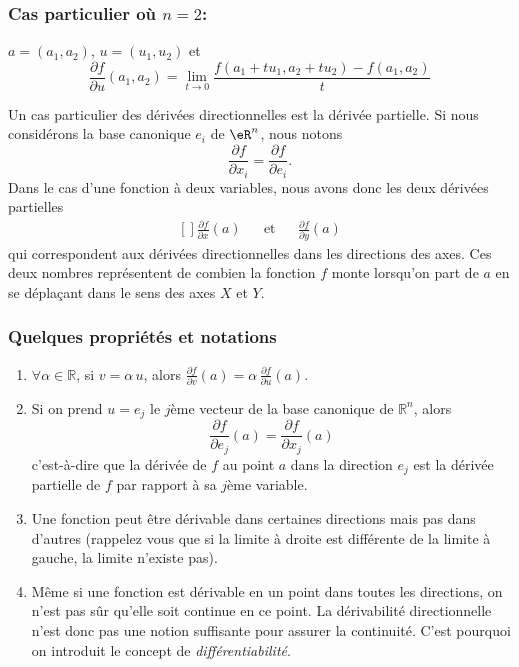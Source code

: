 \subsubsection*{Cas particulier où $n=2$:} $a = (a_1, a_2)$, $u =
(u_1,u_2)$ et
$$\frac{\partial f}{\partial u}(a_1, a_2) = \lim_{t\rightarrow
0}\frac{f(a_1+tu_1,a_2+tu_2) - f(a_1, a_2)}{t}$$

Un cas particulier des dérivées directionnelles est la dérivée partielle. Si nous considérons la base canonique $e_i$ de $\eR^n$, nous notons
\begin{equation}
    \frac{ \partial f }{ \partial x_i }=\frac{ \partial f }{ \partial e_i }.
\end{equation}
Dans le cas d'une fonction à deux variables, nous avons donc les deux dérivées partielles
\begin{equation}
    \begin{aligned}[]
        \frac{ \partial f }{ \partial x }(a)&&\text{et}&&\frac{ \partial f }{ \partial y }(a)
    \end{aligned}
\end{equation}
qui correspondent aux dérivées directionnelles dans les directions des axes. Ces deux nombres représentent de combien la fonction $f$ monte lorsqu'on part de $a$ en se déplaçant dans le sens des axes $X$ et $Y$.

                    \subsubsection{Quelques propriétés et notations}

\begin{enumerate}
\item
 $\forall \alpha \in \mathbb{R}$,
si $v = \alpha\,u$, alors $\frac{\partial f}{\partial v}(a) =
\alpha\,\frac{\partial f}{\partial u}(a)$.
\item Si on prend $u=e_j$ le $j$ème vecteur de la base canonique de
$\mathbb{R}^n$, alors
$$\frac{\partial f}{\partial e_j}(a) = \frac{\partial f}{\partial
x_j}(a)$$ c'est-à-dire que la dérivée de $f$ au point $a$ dans la
direction $e_j$ est la dérivée partielle de $f$ par rapport à sa
$j$ème variable.

\item 
Une fonction peut être dérivable dans certaines directions
mais pas dans d'autres (rappelez vous que si la limite à droite est
différente de la limite à gauche, la limite n'existe pas). 

\item
Même si une fonction est dérivable en un point dans toutes les
directions, on n'est pas sûr qu'elle soit continue en ce point. La
dérivabilité directionnelle n'est donc pas une notion suffisante
pour assurer la continuité. C'est pourquoi on introduit le concept
de \emph{différentiabilité}. 
\end{enumerate}

